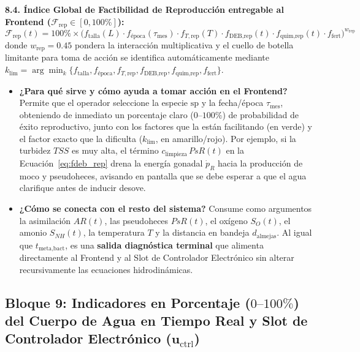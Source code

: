\documentclass[11pt,letterpaper]{article}
\begin{document}
\begin{formulabox}
\textbf{8.4. Índice Global de Factibilidad de Reproducción entregable al Frontend ($\mathcal{F}_{\text{rep}} \in [0, 100\%]$):}
\begin{equation}
\mathcal{F}_{\text{rep}}(t) = 100\% \times \Big(f_{\text{talla}}(L)\cdot f_{\text{época}}(\tau_{\text{mes}})\cdot f_{T,\text{rep}}(T)\cdot f_{\text{DEB,rep}}(t)\cdot f_{\text{quim,rep}}(t)\cdot f_{\text{fert}}\Big)^{w_{\text{rep}}}
\label{eq:frep_total}
\end{equation}
donde $w_{\text{rep}} = 0.45$ pondera la interacción multiplicativa y el cuello de botella limitante para toma de acción se identifica automáticamente mediante $k_{\text{lim}} = \arg\min_{k} \{f_{\text{talla}}, f_{\text{época}}, f_{T,\text{rep}}, f_{\text{DEB,rep}}, f_{\text{quim,rep}}, f_{\text{fert}}\}$.
\end{formulabox}

\begin{itemize}[leftmargin=1.5em]
    \item \textbf{¿Para qué sirve y cómo ayuda a tomar acción en el Frontend?} Permite que el operador seleccione la especie $\text{sp}$ y la fecha/época $\tau_{\text{mes}}$, obteniendo de inmediato un porcentaje claro ($0\text{--}100\%$) de probabilidad de éxito reproductivo, junto con los factores que la están facilitando (en verde) y el factor exacto que la dificulta ($k_{\text{lim}}$, en amarillo/rojo). Por ejemplo, si la turbidez $TSS$ es muy alta, el término $c_{\text{limpieza}}\,PsR(t)$ en la Ecuación~\eqref{eq:fdeb_rep} drena la energía gonadal $\dot{p}_R$ hacia la producción de moco y pseudoheces, avisando en pantalla que se debe esperar a que el agua clarifique antes de inducir desove.
    \item \textbf{¿Cómo se conecta con el resto del sistema?} Consume como argumentos la asimilación $AR(t)$, las pseudoheces $PsR(t)$, el oxígeno $S_O(t)$, el amonio $S_{NH}(t)$, la temperatura $T$ y la distancia en bandeja $d_{\text{almejas}}$. Al igual que $t_{\text{meta,bact}}$, es una \textbf{salida diagnóstica terminal} que alimenta directamente al Frontend y al Slot de Controlador Electrónico sin alterar recursivamente las ecuaciones hidrodinámicas.
\end{itemize}

\subsection{Bloque 9: Indicadores en Porcentaje ($0\text{--}100\%$) del Cuerpo de Agua en Tiempo Real y Slot de Controlador Electrónico ($\mathbf{u}_{\text{ctrl}}$)}
\end{document}
